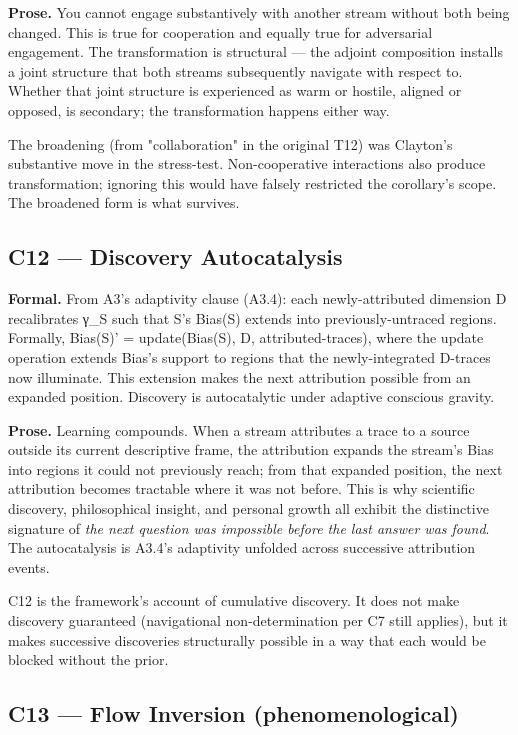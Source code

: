 \documentclass[11pt, openany]{book}
\begin{document}
\textbf{Prose.} You cannot engage substantively with another stream without both being changed. This is true for cooperation and equally true for adversarial engagement. The transformation is structural --- the adjoint composition installs a joint structure that both streams subsequently navigate with respect to. Whether that joint structure is experienced as warm or hostile, aligned or opposed, is secondary; the transformation happens either way.

The broadening (from "collaboration" in the original T12) was Clayton's substantive move in the stress-test. Non-cooperative interactions also produce transformation; ignoring this would have falsely restricted the corollary's scope. The broadened form is what survives.

\subsection{C12 --- Discovery Autocatalysis}

\textbf{Formal.} From A3's adaptivity clause (A3.4): each newly-attributed dimension D recalibrates γ\_\allowbreak{}S such that S's Bias(S) extends into previously-untraced regions. Formally, Bias(S)' = update(Bias(S), D, attributed-traces), where the update operation extends Bias's support to regions that the newly-integrated D-traces now illuminate. This extension makes the next attribution possible from an expanded position. Discovery is autocatalytic under adaptive conscious gravity.

\textbf{Prose.} Learning compounds. When a stream attributes a trace to a source outside its current descriptive frame, the attribution expands the stream's Bias into regions it could not previously reach; from that expanded position, the next attribution becomes tractable where it was not before. This is why scientific discovery, philosophical insight, and personal growth all exhibit the distinctive signature of \textit{the next question was impossible before the last answer was found}. The autocatalysis is A3.4's adaptivity unfolded across successive attribution events.

C12 is the framework's account of cumulative discovery. It does not make discovery guaranteed (navigational non-determination per C7 still applies), but it makes successive discoveries structurally possible in a way that each would be blocked without the prior.

\subsection{C13 --- Flow Inversion (phenomenological)}
\end{document}
